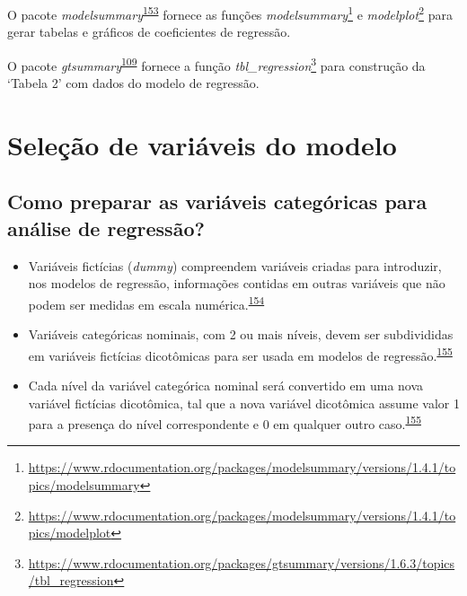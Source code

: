 \documentclass[
  a4paper,
]{book}
\renewcommand{\href}[2]{#2\footnote{\url{#1}}}
\newenvironment{infobox}[1]
  {
  \begin{itemize}
  \renewcommand{\labelitemi}{
    \raisebox{-.7\height}[0pt][0pt]{
      {\setkeys{Gin}{width=3em,keepaspectratio}
        \texttt{[image: \#1]}}
    }
  }
  \setlength{\fboxsep}{1em}
  \begin{blackbox}
  \item
  }
  {
  \end{blackbox}
  \end{itemize}
  }
\begin{document}
\begin{infobox}{images/Rlogo}
O pacote \emph{modelsummary}\textsuperscript{\protect\hyperlink{ref-modelsummary}{153}} fornece as funções \href{https://www.rdocumentation.org/packages/modelsummary/versions/1.4.1/topics/modelsummary}{\emph{modelsummary}} e \href{https://www.rdocumentation.org/packages/modelsummary/versions/1.4.1/topics/modelplot}{\emph{modelplot}} para gerar tabelas e gráficos de coeficientes de regressão.

\end{infobox}

\begin{infobox}{images/Rlogo}
O pacote \emph{gtsummary}\textsuperscript{\protect\hyperlink{ref-gtsummary-2}{109}} fornece a função \href{https://www.rdocumentation.org/packages/gtsummary/versions/1.6.3/topics/tbl_regression}{\emph{tbl\_regression}} para construção da `Tabela 2' com dados do modelo de regressão.

\end{infobox}

\hypertarget{selecao}{%
\section{Seleção de variáveis do modelo}\label{selecao}}

\hypertarget{como-preparar-as-variuxe1veis-categuxf3ricas-para-anuxe1lise-de-regressuxe3o}{%
\subsection{Como preparar as variáveis categóricas para análise de regressão?}\label{como-preparar-as-variuxe1veis-categuxf3ricas-para-anuxe1lise-de-regressuxe3o}}

\begin{itemize}
\item
  Variáveis fictícias (\emph{dummy}) compreendem variáveis criadas para introduzir, nos modelos de regressão, informações contidas em outras variáveis que não podem ser medidas em escala numérica.\textsuperscript{\protect\hyperlink{ref-suits1957}{154}}
\item
  Variáveis categóricas nominais, com 2 ou mais níveis, devem ser subdivididas em variáveis fictícias dicotômicas para ser usada em modelos de regressão.\textsuperscript{\protect\hyperlink{ref-Healy1995}{155}}
\item
  Cada nível da variável categórica nominal será convertido em uma nova variável fictícias dicotômica, tal que a nova variável dicotômica assume valor 1 para a presença do nível correspondente e 0 em qualquer outro caso.\textsuperscript{\protect\hyperlink{ref-Healy1995}{155}}
\end{itemize}
\end{document}
